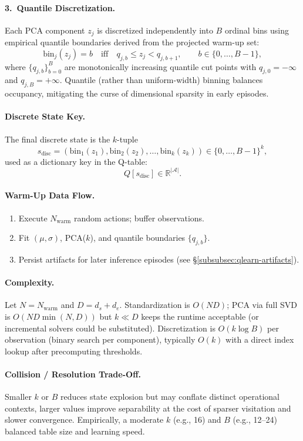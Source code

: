 \paragraph{3.\ Quantile Discretization.}
Each PCA component $z_j$ is discretized independently into $B$ ordinal bins using empirical quantile boundaries derived from the projected warm-up set:
\[
\text{bin}_j(z_j) = b \quad \text{iff} \quad q_{j,b} \le z_j < q_{j,b+1}, \qquad b \in \{0,\dots,B-1\},
\]
where $\{q_{j,b}\}_{b=0}^{B}$ are monotonically increasing quantile cut points with $q_{j,0}=-\infty$ and $q_{j,B}=+\infty$. Quantile (rather than uniform-width) binning balances occupancy, mitigating the curse of dimensional sparsity in early episodes.

\paragraph{Discrete State Key.}
The final discrete state is the $k$-tuple
\[
s_{\text{disc}} = (\text{bin}_1(z_1), \text{bin}_2(z_2), \dots, \text{bin}_k(z_k)) \in \{0,\dots,B-1\}^k,
\]
used as a dictionary key in the Q-table:
\[
Q[s_{\text{disc}}] \in \mathbb{R}^{|\mathcal{A}|}.
\]

\paragraph{Warm-Up Data Flow.}
\begin{enumerate}
  \item Execute $N_{\text{warm}}$ random actions; buffer observations.
  \item Fit $(\mu,\sigma)$, PCA($k$), and quantile boundaries $\{q_{j,b}\}$.
  \item Persist artifacts for later inference episodes (see \S\ref{subsubsec:qlearn-artifacts}).
\end{enumerate}

\paragraph{Complexity.}
Let $N=N_{\text{warm}}$ and $D=d_s+d_e$. Standardization is $O(ND)$; PCA via full SVD is $O(ND\min(N,D))$ but $k \ll D$ keeps the runtime acceptable (or incremental solvers could be substituted). Discretization is $O(k \log B)$ per observation (binary search per component), typically $O(k)$ with a direct index lookup after precomputing thresholds.

\paragraph{Collision / Resolution Trade-Off.}
Smaller $k$ or $B$ reduces state explosion but may conflate distinct operational contexts, larger values improve separability at the cost of sparser visitation and slower convergence. Empirically, a moderate $k$ (e.g., 16) and $B$ (e.g., 12--24) balanced table size and learning speed.


